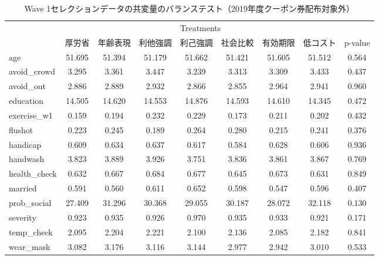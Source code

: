 \documentclass[
  11pt,
  a4paper,
]{article}
\begin{document}
\begin{table}

\caption{\label{tab:show-act-coupon0-balance}Wave 1セレクションデータの共変量のバランステスト（2019年度クーポン券配布対象外）}
\centering
\begin{tabular}[t]{lcccccccc}
\toprule
\multicolumn{1}{c}{ } & \multicolumn{7}{c}{Treatments} & \multicolumn{1}{c}{ } \\
\cmidrule(l{3pt}r{3pt}){2-8}
  & 厚労省 & 年齢表現 & 利他強調 & 利己強調 & 社会比較 & 有効期限 & 低コスト & p-value\\
\midrule
age & 51.695 & 51.394 & 51.179 & 51.662 & 51.421 & 51.605 & 51.512 & 0.564\\
avoid\_crowd & 3.295 & 3.361 & 3.447 & 3.239 & 3.313 & 3.309 & 3.433 & 0.437\\
avoid\_out & 2.886 & 2.889 & 2.932 & 2.866 & 2.855 & 2.964 & 2.941 & 0.960\\
education & 14.505 & 14.620 & 14.553 & 14.876 & 14.593 & 14.610 & 14.345 & 0.472\\
exercise\_w1 & 0.159 & 0.194 & 0.232 & 0.229 & 0.173 & 0.211 & 0.202 & 0.432\\
flushot & 0.223 & 0.245 & 0.189 & 0.264 & 0.280 & 0.215 & 0.241 & 0.376\\
handicap & 0.609 & 0.634 & 0.637 & 0.617 & 0.584 & 0.628 & 0.606 & 0.936\\
handwash & 3.823 & 3.889 & 3.926 & 3.751 & 3.836 & 3.861 & 3.867 & 0.769\\
health\_check & 0.632 & 0.667 & 0.684 & 0.677 & 0.645 & 0.673 & 0.631 & 0.849\\
married & 0.591 & 0.560 & 0.611 & 0.652 & 0.598 & 0.547 & 0.596 & 0.407\\
prob\_social & 27.409 & 31.296 & 30.368 & 29.055 & 30.187 & 28.072 & 32.118 & 0.130\\
severity & 0.923 & 0.935 & 0.926 & 0.970 & 0.935 & 0.933 & 0.921 & 0.171\\
temp\_check & 2.095 & 2.204 & 2.221 & 2.100 & 2.136 & 2.085 & 2.182 & 0.841\\
wear\_mask & 3.082 & 3.176 & 3.116 & 3.144 & 2.977 & 2.942 & 3.010 & 0.533\\
\bottomrule
\end{tabular}
\end{table}
\end{document}
